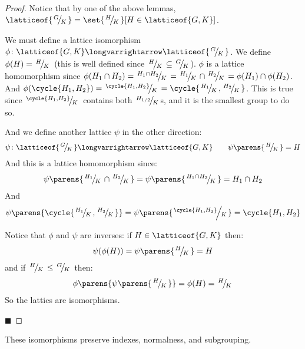 \documentclass[10pt]{article}
\def\slfrac#1#2{\left.{}^{#1}\mkern-4mu\middle/\mkern-3mu{}_{#2}\right.}
\begin{document}
\begin{proof}

    Notice that by one of the above lemmas, $\latticeof{\slfrac GK}=\set{\slfrac HK}[H\in\latticeof{G,K}]$.

    We must define a lattice isomorphism $\phi\colon\latticeof{G, K}\longvarrightarrow\latticeof{\slfrac GK}$.
    We define $\phi(H)=\slfrac HK$ (this is well defined since $\slfrac HK\subseteq\slfrac GK$).
    $\phi$ is a lattice homomorphism since $\phi(H_1\cap H_2)=\slfrac{H_1\cap H_2}K=\slfrac{H_1}K\cap\slfrac{H_2}K=\phi(H_1)\cap\phi(H_2)$.
    And $\phi(\cycle{H_1,H_2})=\slfrac{\cycle{H_1,H_2}}K=\cycle{\slfrac{H_1}K, \slfrac{H_2}K}$.
    This is true since $\slfrac{\cycle{H_1,H_2}}K$ contains both $\slfrac{H_{1/2}}K$s, and it is the smallest group to do so.

    And we define another lattice $\psi$ in the other direction:
    \[ \psi\colon\latticeof{\slfrac GK}\longvarrightarrow\latticeof{G,K} \qquad \psi\parens{\slfrac HK}=H \]
    And this is a lattice homomorphism since:
    \[ \psi\parens{\slfrac{H_1}K\cap\slfrac{H_2}K} = \psi\parens{\slfrac{H_1\cap H_2}K} = H_1\cap H_2 \]
    And
    \[ \psi\parens{\cycle{\slfrac{H_1}K, \slfrac{H_2}K}} = \psi\parens{\slfrac{\cycle{H_1,H_2}}K} = \cycle{H_1,H_2} \]

    Notice that $\phi$ and $\psi$ are inverses: if $H\in\latticeof{G,K}$ then:
    \[ \psi(\phi(H)) = \psi\parens{\slfrac HK} = H \]
    and if $\slfrac HK\leq\slfrac GK$ then:
    \[ \phi\parens{\psi\parens{\slfrac HK}} = \phi(H) = \slfrac HK \]
    So the lattics are isomorphisms.

    \hfill$\blacksquare$

\end{proof}

These isomorphisms preserve indexes, normalness, and subgrouping.
\end{document}
